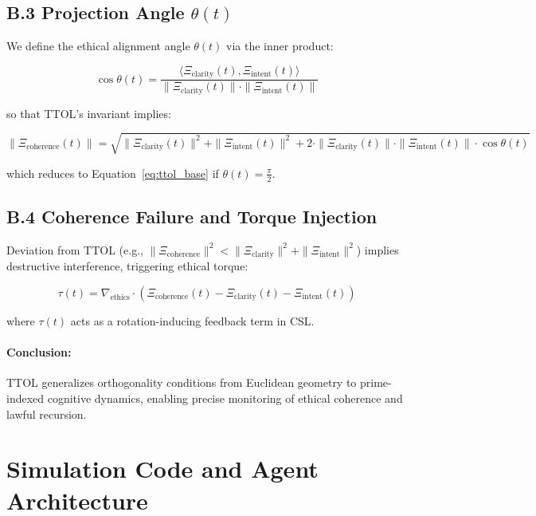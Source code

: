 \documentclass[12]{amsart}
\theoremstyle{plain}
\begin{document}
\subsection*{B.3 Projection Angle $\theta(t)$}

We define the ethical alignment angle $\theta(t)$ via the inner product:

\begin{equation}
\cos \theta(t) = \frac{ \langle \Xi_{\text{clarity}}(t), \Xi_{\text{intent}}(t) \rangle }{ \| \Xi_{\text{clarity}}(t) \| \cdot \| \Xi_{\text{intent}}(t) \| }
\end{equation}

\noindent
so that TTOL’s invariant implies:

\begin{equation}
\|\Xi_{\text{coherence}}(t)\| = \sqrt{ \| \Xi_{\text{clarity}}(t) \|^2 + \| \Xi_{\text{intent}}(t) \|^2 + 2 \cdot \|\Xi_{\text{clarity}}(t)\| \cdot \|\Xi_{\text{intent}}(t)\| \cdot \cos \theta(t) }
\end{equation}

\noindent
which reduces to Equation~\ref{eq:ttol_base} if $\theta(t) = \frac{\pi}{2}$.

\subsection*{B.4 Coherence Failure and Torque Injection}

Deviation from TTOL (e.g., $\|\Xi_{\text{coherence}}\|^2 < \|\Xi_{\text{clarity}}\|^2 + \|\Xi_{\text{intent}}\|^2$) implies destructive interference, triggering ethical torque:

\begin{equation}
\tau(t) = \nabla_{\text{ethics}} \cdot \left( \Xi_{\text{coherence}}(t) - \Xi_{\text{clarity}}(t) - \Xi_{\text{intent}}(t) \right)
\end{equation}

\noindent
where $\tau(t)$ acts as a rotation-inducing feedback term in CSL.

\paragraph{Conclusion:} TTOL generalizes orthogonality conditions from Euclidean geometry to prime-indexed cognitive dynamics, enabling precise monitoring of ethical coherence and lawful recursion.

\clearpage

\section{Simulation Code and Agent Architecture}
\end{document}
